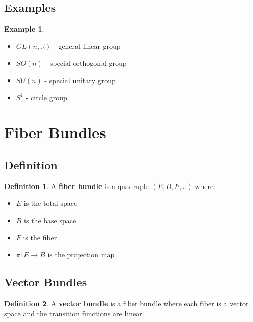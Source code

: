 \documentclass[11pt]{article}
\theoremstyle{definition}
\newtheorem{definition}{Definition}[section]
\newtheorem{example}{Example}[section]
\begin{document}
\subsection{Examples}
\begin{example}
\begin{itemize}
    \item $GL(n,\mathbb{R})$ - general linear group
    \item $SO(n)$ - special orthogonal group
    \item $SU(n)$ - special unitary group
    \item $S^1$ - circle group
\end{itemize}
\end{example}

\section{Fiber Bundles}

\subsection{Definition}
\begin{definition}
A \textbf{fiber bundle} is a quadruple $(E, B, F, \pi)$ where:
\begin{itemize}
    \item $E$ is the total space
    \item $B$ is the base space
    \item $F$ is the fiber
    \item $\pi: E \to B$ is the projection map
\end{itemize}
\end{definition}

\subsection{Vector Bundles}
\begin{definition}
A \textbf{vector bundle} is a fiber bundle where each fiber is a vector space and the transition functions are linear.
\end{definition}
\end{document}
